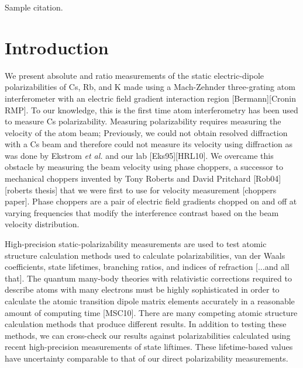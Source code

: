 \documentclass[twocolumn, prl,showpacs,superscriptaddress]{revtex4-1}   %
\newcommand{\etal}{\textit{et al. }}
\begin{document}
\maketitle

Sample citation\cite{Hro14}.







\section{Introduction}

We present absolute and ratio measurements of the static electric-dipole polarizabilities of Cs, Rb, and K made using a Mach-Zehnder three-grating atom interferometer with an electric field gradient interaction region [Bermann][Cronin RMP]. To our knowledge, this is the first time atom interferometry has been used to measure Cs polarizability. Measuring polarizability requires measuring the velocity of the atom beam; Previously, we could not obtain resolved diffraction with a Cs beam and therefore could not measure its velocity using diffraction as was done by Ekstrom \etal and our lab [Eks95][HRL10]. We overcame this obstacle by measuring the beam velocity using phase choppers, a successor to mechanical choppers invented by Tony Roberts and David Pritchard [Rob04][roberts thesis] that we were first to use for velocity measurement [choppers paper]. Phase choppers are a pair of electric field gradients chopped on and off at varying frequencies that modify the interference contrast based on the beam velocity distribution.

High-precision static-polarizability measurements are used to test atomic structure calculation methods used to calculate polarizabilities, van der Waals coefficients, state lifetimes, branching ratios, and indices of refraction [...and all that]. The quantum many-body theories with relativistic corrections required to describe atoms with many electrons must be highly sophisticated in order to calculate the atomic transition dipole matrix elements accurately in a reasonable amount of computing time [MSC10]. There are many competing atomic structure calculation methods that produce different results. In addition to testing these methods, we can cross-check our results against polarizabilities calculated using recent high-precision measurements of state liftimes. These lifetime-based values have uncertainty comparable to that of our direct polarizability measurements.
\end{document}
